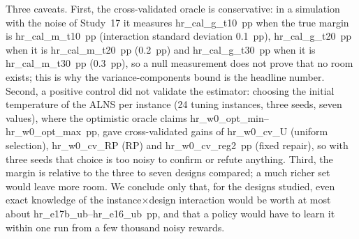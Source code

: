 Three caveats. First, the cross-validated oracle is conservative: in a simulation with the noise of Study~17 it measures \num{hr_cal_g_t10}~pp when the true margin is \num{hr_cal_m_t10}~pp (interaction standard deviation 0.1~pp), \num{hr_cal_g_t20}~pp when it is \num{hr_cal_m_t20}~pp (0.2~pp) and \num{hr_cal_g_t30}~pp when it is \num{hr_cal_m_t30}~pp (0.3~pp), so a null measurement does not prove that no room exists; this is why the variance-components bound is the headline number. Second, a positive control did not validate the estimator: choosing the initial temperature of the ALNS per instance (24 tuning instances, three seeds, seven values), where the optimistic oracle claims \num{hr_w0_opt_min}--\num{hr_w0_opt_max}~pp, gave cross-validated gains of \num{hr_w0_cv_U} (uniform selection), \num{hr_w0_cv_RP} (RP) and \num{hr_w0_cv_reg2}~pp (fixed repair), so with three seeds that choice is too noisy to confirm or refute anything. Third, the margin is relative to the three to seven designs compared; a much richer set would leave more room. We conclude only that, for the designs studied, even exact knowledge of the instance$\times$design interaction would be worth at most about \num{hr_e17b_ub}--\num{hr_e16_ub}~pp, and that a policy would have to learn it within one run from a few thousand noisy rewards.



